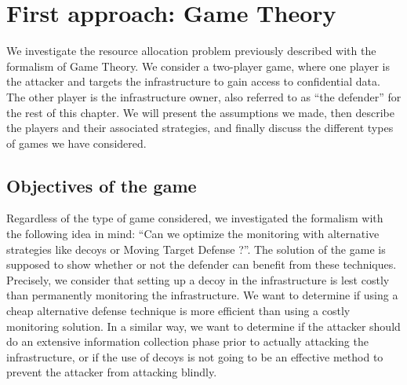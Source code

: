 \section{First approach: Game Theory}

We investigate the resource allocation problem previously described with the formalism of Game Theory.
We consider a two-player game, where one player is the attacker and targets the infrastructure to gain access to confidential data. The other player is the infrastructure owner, also referred to as ``the defender'' for the rest of this chapter.
We will present the assumptions we made, then describe the players and their associated strategies, and finally discuss the different types of games we have considered.

\subsection{Objectives of the game}
Regardless of the type of game considered, we investigated the formalism with the following idea in mind: ``Can we optimize the monitoring with alternative strategies like decoys or Moving Target Defense ?''. 
The solution of the game is supposed to show whether or not the defender can benefit from these techniques. Precisely, we consider that setting up a decoy in the infrastructure is lest costly than permanently monitoring the infrastructure. We want to determine if using a cheap alternative defense technique is more efficient than using a costly monitoring solution.
In a similar way, we want to determine if the attacker should do an extensive information collection phase prior to actually attacking the infrastructure, or if the use of decoys is not going to be an effective method to prevent the attacker from attacking blindly.




